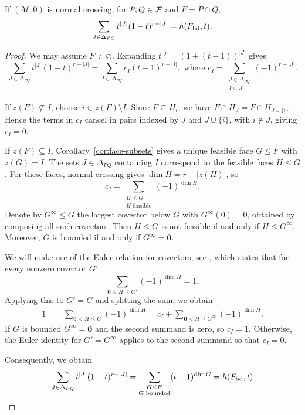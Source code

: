 \begin{lemma}\label{lem:face-enumeration}
If $(\mathcal M,0)$ is normal crossing, for $P,Q\in\mathcal F$ and $F=\bar P\cap\bar Q$,
\[
 \sum_{J\in\Delta_{PQ}}t^{|J|}(1-t)^{r-|J|}=h(F_{\mathrm{bd}},t).
\]
\end{lemma}
\begin{proof}
We may assume $F\ne\varnothing$.
Expanding $t^{|J|}=(1+(t-1))^{|J|}$ gives
\[
 \sum_{J\in\Delta_{PQ}}t^{|J|}(1-t)^{r-|J|}
 =\sum_{I\in\Delta_{PQ}}c_I(t-1)^{r-|I|},
\text{ where }
 c_I=\sum_{\substack{J\in\Delta_{PQ}\\I\subseteq J}}(-1)^{r-|J|}.
\]

If $z(F)\not\subseteq I$, choose $i\in z(F)\setminus I$. Since
$F\subseteq H_i$, we have $
 F\cap H_J=F\cap H_{J\cup\{i\}}.$
Hence the terms in $c_I$ cancel in pairs indexed by $J$
and $J\cup\{i\}$, with $i\notin J$, giving $c_I=0$.

If $z(F)\subseteq I$, Corollary~\ref{cor:face-subsets} gives a unique
feasible face $G\leq F$ with $z(G)=I$. The sets $J\in\Delta_{PQ}$
containing $I$ correspond to the feasible faces $H\leq G$.
For these faces, normal crossing gives $\dim H=r-|z(H)|$, so
\[
 c_I=\sum_{\substack{H\leq G\\H \text{ feasible}}}(-1)^{\dim H}.
\]
Denote by $G^\infty\leq G$ the largest covector below $G$ with
$G^\infty(0)=0$, obtained by composing all such covectors. Then
$H\leq G$ is not feasible if and only if $H\leq G^\infty$.
Moreover, $G$ is bounded if and only if $G^\infty=\mathbf0$.

We will make use of the Euler relation for covectors, see 
\cite[Corollary 4.3.8]{OrientedMatroids1999}, which states that for every nonzero covector $G'$
\[
 \sum_{\mathbf0<H\leq G'}(-1)^{\dim H}=1.
\]
Applying this to $G'=G$ and splitting the sum, we obtain
\[
 \begin{aligned}
  1 &=\sum_{\mathbf0<H\leq G}(-1)^{\dim H}  = c_I
    +\sum_{\mathbf0<H\leq G^\infty }
       (-1)^{\dim H}.
 \end{aligned}
\]
If $G$ is bounded $G^\infty=\mathbf{0}$ and the second summand is zero, so $c_I=1$. Otherwise, the Euler identity for $G'=G^\infty$ applies to the second summand so that $c_I=0$.

Consequently, we obtain
\[
 \sum_{J\in\Delta_{PQ}}t^{|J|}(1-t)^{r-|J|}
 =\sum_{\substack{G\leq F\\G\text{ bounded}}}(t-1)^{\dim G}
 =h(F_{\mathrm{bd}},t)\qedhere
\]
\end{proof}
